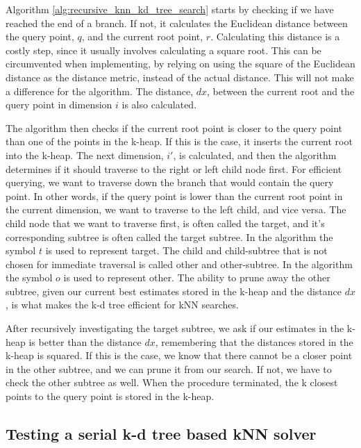 Algorithm \ref{alg:recursive_knn_kd_tree_search} starts by checking if we have reached the end of a branch. If not, it calculates the Euclidean distance between the query point, $q$, and the current root point, $r$. Calculating this distance is a costly step, since it usually involves calculating a square root. This can be circumvented when implementing, by relying on using the square of the Euclidean distance as the distance metric, instead of the actual distance. This will not make a difference for the algorithm. The distance, $dx$, between the current root and the query point in dimension $i$ is also calculated.

The algorithm then checks if the current root point is closer to the query point than one of the points in the k-heap. If this is the case, it inserts the current root into the k-heap. The next dimension, $i'$, is calculated, and then the algorithm determines if it should traverse to the right or left child node first. For efficient querying, we want to traverse down the branch that would contain the query point. In other words, if the query point is lower than the current root point in the current dimension, we want to traverse to the left child, and vice versa. The child node that we want to traverse first, is often called the target, and it's corresponding subtree is often called the target subtree. In the algorithm the symbol $t$ is used to represent target. The child and child-subtree that is not chosen for immediate traversal is called other and other-subtree. In the algorithm the symbol $o$ is used to represent other. The ability to prune away the other subtree, given our current best estimates stored in the k-heap and the distance $dx$, is what makes the k-d tree efficient for kNN searches.

After recursively investigating the target subtree, we ask if our estimates in the k-heap is better than the distance $dx$, remembering that the distances stored in the k-heap is squared. If this is the case, we know that there cannot be a closer point in the other subtree, and we can prune it from our search. If not, we have to check the other subtree as well. When the procedure terminated, the k closest points to the query point is stored in the k-heap.

\subsection{Testing a serial k-d tree based kNN solver} %
\label{sub:testing_a_serial_k_d_tree_based_knn_solver}

